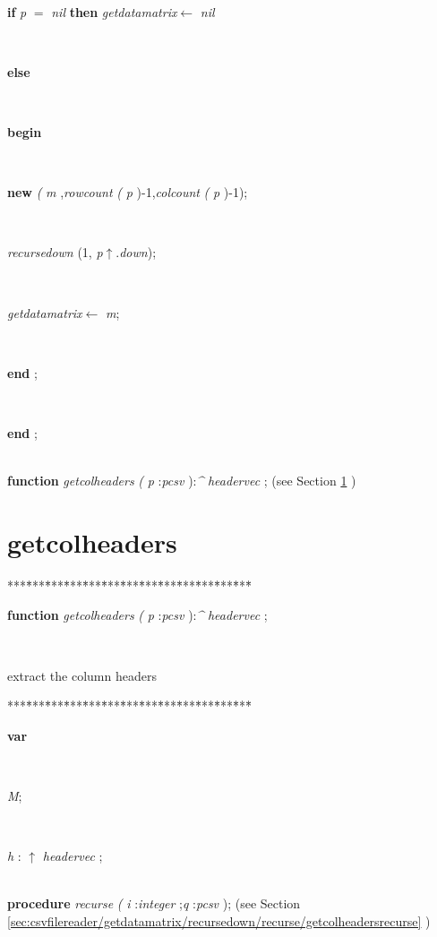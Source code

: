 \begin{tabbing}
\\
\+\parbox{14cm}{\textsf {\textbf {if } \textsf{\textit{p} $=$ \textit{nil}} \textbf{ then } \textsf{\textit{getdatamatrix}$\leftarrow$ \textit{nil}}}}\\
\<\parbox{14cm}{\textsf{\textbf{else} }}\\
\<\parbox{14cm}{\textsf{\textbf{begin} }}\\
\parbox{14cm}{\textsf{\textbf{new} \textit{(} \textit{m} ,\textit{rowcount} \textit{(} \textit{p} )-1,\textit{colcount} \textit{(} \textit{p} )-1);}}\\
\parbox{14cm}{\textsf{\textit{recursedown} (1, \textit{p}$\uparrow$.\textit{down})}; }\\
\parbox{14cm}{\textsf{\textit{getdatamatrix}$\leftarrow$ \textit{m}}; }\\
\<\-\parbox{14cm}{\textsf{\textbf{end} ;}}\\
\<\-\parbox{14cm}{\textsf{\textbf{end} ;}}\\
\+\textsf{\textbf{function}  \textit{getcolheaders} \textit{(} \textit{p} :\textit{pcsv} ):\textit{\^{}} \textit{headervec} ;} (see Section \ref{sec:csvfilereader/getdatamatrix/recursedown/recursegetcolheaders} )\\
\end{tabbing}
\section{getcolheaders}\label{sec:csvfilereader/getdatamatrix/recursedown/recursegetcolheaders}

\begin{tabbing}
***\=***\=***\=***\=***\=***\=***\=***\=***\=***\=***\=***\=***\=\kill
\parbox{14cm}{\textsf{\textbf{function}  \textit{getcolheaders} \textit{(} \textit{p} :\textit{pcsv} ):\textit{\^{}} \textit{headervec} ;}}\\
\end{tabbing}
extract the column headers
\begin{tabbing}
***\=***\=***\=***\=***\=***\=***\=***\=***\=***\=***\=***\=***\=\kill
\\
\+\parbox{14cm}{\textsf{\textbf{var} }}\\
\parbox{14cm}{\textsf{\textit{M}}; }\\
\parbox{14cm}{\textsf{\textit{h} : $\uparrow$ \textit{headervec} }; }\\
\<\textsf{\textbf{procedure}  \textit{recurse} \textit{(} \textit{i} :\textit{integer} ;\textit{q} :\textit{pcsv} );} (see Section \ref{sec:csvfilereader/getdatamatrix/recursedown/recurse/getcolheadersrecurse} )\\
\end{tabbing}
